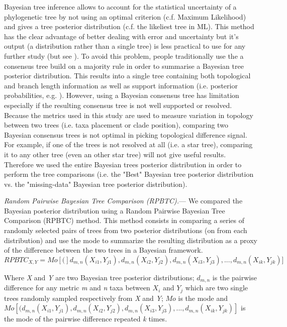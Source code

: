 \documentclass[12pt,letterpaper]{article}
\renewcommand{\subsubsection}[1]{%
\vspace{2ex}
\noindent
\textit{#1.}---}
\begin{document}
Bayesian tree inference allows to account for the statistical uncertainty of a phylogenetic tree by not using an optimal criterion (c.f. Maximum Likelihood) and gives a tree posterior distribution (c.f. the likeliest tree in ML).
This method has the clear advantage of better dealing with error and uncertainty but it's output (a distribution rather than a single tree) is less practical to use for any further study (but see \citet{healyecology2014}). %
To avoid this problem, people traditionally use the a consensus tree build on a majority rule in order to summarise a Bayesian tree posterior distribution.
This results into a single tree containing both topological and branch length information as well as support information (i.e. posterior probabilities, e.g. \citet{Ronquist2012mrbayes}).
However, using a Bayesian consensus tree has limitation especially if the resulting consensus tree is not well supported or resolved.
Because the metrics used in this study are used to measure variation in topology between two trees (i.e. taxa placement or clade position), comparing two Bayesian consensus trees is not optimal in picking topological difference signal.
For example, if one of the trees is not resolved at all (i.e. a star tree), comparing it to any other tree (even an other star tree) will not give useful results.
Therefore we used the entire Bayesian trees posterior distribution in order to perform the tree comparisons (i.e. the "Best" Bayesian tree posterior distribution vs. the "missing-data" Bayesian tree posterior distribution).

\subsubsection{Random Pairwise Bayesian Tree Comparison (RPBTC)}
We compared the Bayesian posterior distribution using a Random Pairwise Bayesian Tree Comparison (RPBTC) method.
This method consists in comparing a series of randomly selected pairs of trees from two posterior distributions (on from each distribution) and use the mode to summarize the resulting distribution as a proxy of the difference between the two trees in a Bayesian framework.
\begin{equation}
RPBTC_{X,Y}=Mo[(]d_{m,n}(X_{i1},Y_{j1}),d_{m,n}(X_{i2},Y_{j2}),d_{m,n}(X_{i3},Y_{j3}), ... ,d_{m,n}(X_{ik},Y_{jk})]
\end{equation}

Where \textit{X} and \textit{Y} are two Bayesian tree posterior distributions;
 $d_{m,n}$ is the pairwise difference for any metric \textit{m} and \textit{n} taxa between $X_{i}$ and $Y_{j}$ which are two single trees randomly sampled respectively from \textit{X} and \textit{Y};
 $Mo$ is the mode and
 $Mo[(d_{m,n}(X_{i1},Y_{j1}),d_{m,n}(X_{i2},Y_{j2}),d_{m,n}(X_{i3},Y_{j3}), ... ,d_{m,n}(X_{ik},Y_{jk})]$ is the mode of the pairwise difference repeated \textit{k} times.
\end{document}
